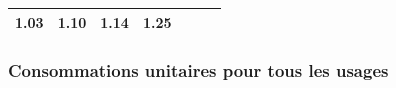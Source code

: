 \documentclass[]{article}
\begin{document}
\begin{longtable}[]{@{}clrrrrr@{}}
\begin{minipage}[t]{0.08\columnwidth}
1.03\strut
\end{minipage} & \begin{minipage}[t]{0.08\columnwidth}\raggedleft\strut
1.10\strut
\end{minipage} & \begin{minipage}[t]{0.08\columnwidth}\raggedleft\strut
1.14\strut
\end{minipage} & \begin{minipage}[t]{0.08\columnwidth}\raggedleft\strut
1.25\strut
\end{minipage}\tabularnewline
\bottomrule
\end{longtable}

\subsubsection{Consommations unitaires pour tous les
usages}\label{consommations-unitaires-pour-tous-les-usages}
\end{document}
